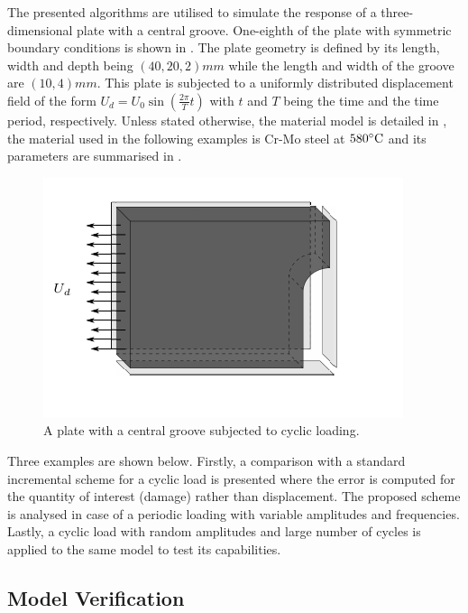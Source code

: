 The presented algorithms are utilised to simulate the response of a three-dimensional plate with a central groove. One-eighth of the plate with symmetric boundary conditions is shown in . The plate geometry is defined by its length, width and depth being {$(40,20,2) \unit{mm}$ while the length and width of the groove are $(10,4) \unit{mm}$.} This plate is subjected to a uniformly distributed displacement field of the form $U_d=U_0 \sin\left(\frac{2\pi}{T} t \right)$ with $t$ and $T$ being the time and the time period, respectively. Unless stated otherwise, the material model is detailed in , the material used in the following examples is Cr-Mo steel at $580^\circ \rm C$ and its parameters are summarised in .
\begin{figure}[hbt!]
	\centering
	\includegraphics{./figures/3d_plate_1_8.pdf}
	\caption{A plate with a central groove subjected to cyclic loading.}
	\label{3dplate}
\end{figure}
Three examples are shown below. Firstly, a comparison with a standard incremental scheme for a cyclic load is presented where the error is computed for the quantity of interest (damage) rather than displacement. The proposed scheme is analysed in case of a periodic loading with variable amplitudes and frequencies. Lastly, a cyclic load with random amplitudes and large number of cycles is applied to the same model to test its capabilities.

\subsection{Model Verification}
\label{model_verification}


